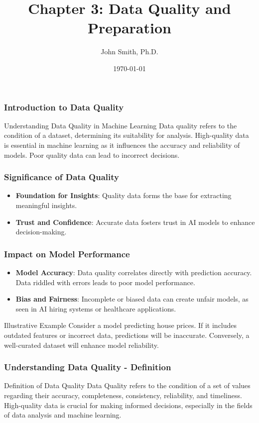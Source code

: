\documentclass[aspectratio=169]{beamer}
\title[Chapter 3]{Chapter 3: Data Quality and Preparation}
\author[J. Smith]{John Smith, Ph.D.}
\institute[University Name]{Department of Computer Science\\University Name\\Email: email@university.edu\\Website: www.university.edu}
\date{\today}
\begin{document}
\frame{\titlepage}

\begin{frame}[fragile]
    \frametitle{Introduction to Data Quality}
    \begin{block}{Understanding Data Quality in Machine Learning}
        Data quality refers to the condition of a dataset, determining its suitability for analysis. High-quality data is essential in machine learning as it influences the accuracy and reliability of models. Poor quality data can lead to incorrect decisions.
    \end{block}
\end{frame}

\begin{frame}[fragile]
    \frametitle{Significance of Data Quality}
    \begin{itemize}
        \item \textbf{Foundation for Insights}:
        Quality data forms the base for extracting meaningful insights.
        \item \textbf{Trust and Confidence}:
        Accurate data fosters trust in AI models to enhance decision-making.
    \end{itemize}
\end{frame}

\begin{frame}[fragile]
    \frametitle{Impact on Model Performance}
    \begin{itemize}
        \item \textbf{Model Accuracy}:
        Data quality correlates directly with prediction accuracy. Data riddled with errors leads to poor model performance.
        \item \textbf{Bias and Fairness}:
        Incomplete or biased data can create unfair models, as seen in AI hiring systems or healthcare applications.
    \end{itemize}

    \begin{block}{Illustrative Example}
        Consider a model predicting house prices. If it includes outdated features or incorrect data, predictions will be inaccurate. Conversely, a well-curated dataset will enhance model reliability.
    \end{block}
\end{frame}

\begin{frame}[fragile]
    \frametitle{Understanding Data Quality - Definition}
    \begin{block}{Definition of Data Quality}
        Data Quality refers to the condition of a set of values regarding their accuracy, completeness, consistency, reliability, and timeliness. 
        High-quality data is crucial for making informed decisions, especially in the fields of data analysis and machine learning.
    \end{block}
\end{frame}
\end{document}
